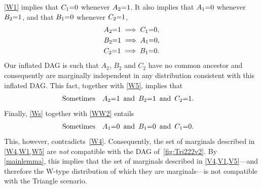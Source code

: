 \cref{W1} %
implies that $C_1\mathord{=} 0$ whenever $A_2 \mathord{=} 1$. It also implies that $A_1\mathord{=} 0$ whenever $B_2\mathord{=} 1$, and that $B_1\mathord{=} 0$ whenever $C_2\mathord{=} 1$, 
\begin{align} 
\begin{split}\label{Ws}
&A_2 \mathord{=} 1 \implies C_1\mathord{=} 0,\\
&B_2\mathord{=} 1 \implies A_1\mathord{=} 0,\\
&C_2 \mathord{=} 1 \implies B_1 \mathord{=} 0.
\end{split}
\end{align}
Our inflated DAG is such that $A_2$, $B_2$ and $C_2$ have no common ancestor and consequently are marginally independent in any distribution consistent with this inflated DAG.  This fact, together with \cref{W5}, implies that %
\begin{align} \label{WW2}
\text{Sometimes} \quad &A_2 \mathord{=} 1\,\text{ and }\, B_2 \mathord{=} 1\,\text{ and }\, C_2 \mathord{=} 1.
\end{align} 
Finally, \cref{Ws} together with \cref{WW2} entails
\begin{align} \label{WW3}
\text{Sometimes} \quad &A_1 \mathord{=} 0\,\text{ and }\, B_1 \mathord{=} 0\,\text{ and }\, C_1 \mathord{=} 0.
\end{align}
This, however, contradicts~\cref{W4}.  Consequently, the set of marginals described in \cref{W4,W1,W5} are \emph{not} compatible with the DAG of~\cref{fig:Tri222v2}.  By \cref{mainlemma}, this implies that the set of marginals described in \cref{V4,V1,V5}---and therefore the W-type distribution of which they are marginals---is not compatible with the Triangle scenario.

